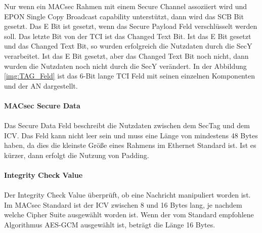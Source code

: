 Nur wenn ein MACsec Rahmen mit einem Secure Channel assoziiert wird und EPON Single Copy Broadcast capability unterstützt, dann wird das SCB Bit gesetzt.
Das E Bit ist gesetzt, wenn das Secure Payload Feld verschlüsselt werden soll.
Das letzte Bit von der \gls{TCI} ist das Changed Text Bit. Ist das E Bit gesetzt und das Changed Text Bit, so wurden erfolgreich die Nutzdaten durch die \gls{SecY} verarbeitet. Ist das E Bit gesetzt, aber das Changed Text Bit noch nicht, dann wurden die Nutzdaten noch nicht durch die SecY verändert.
In der Abbildung \ref{img:TAG_Feld} ist das 6-Bit lange TCI Feld mit seinen einzelnen Komponenten und der \gls{AN} dargestellt.
\\
\\
\textbf{MACsec Secure Data}\\
\\
Das Secure Data Feld beschreibt die Nutzdaten zwischen dem SecTag und dem ICV. Das Feld kann nicht leer sein und muss  eine Länge von mindestens 48 Bytes haben, da dies die kleinste Größe eines Rahmens im Ethernet Standard ist. Ist es kürzer, dann erfolgt die Nutzung von Padding. \\
\\
\textbf{Integrity Check Value}\\
\\
Der Integrity Check Value überprüft, ob eine Nachricht manipuliert worden ist. Im MACsec Standard ist der \gls{ICV} zwischen 8 und 16 Bytes lang, je nachdem welche Cipher Suite ausgewählt worden ist. Wenn der vom Standard empfohlene Algorithmus \gls{AES-GCM} ausgewählt ist, beträgt die Länge 16 Bytes.
